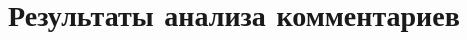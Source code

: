 \begin{comment}
24 & 31. Регулирование и надзор на предприятиях & 0.0171 \\
25 & 49. Районы области & 0.0169 \\
26 & 34. Театры & 0.0168 \\
27 & 38. Коммунальная сфера: отопление & 0.0158 \\
28 & 25. Домашние животные: собаки & 0.0154 \\
29 & 39. Международные отношения России, Украины и США & 0.0148 \\
30 & 40. Информация о различных конкурсах, авиакомпании & 0.012 \\
31 & 24. Жилищный вопрос, социальная сфера & 0.0119 \\
32 & 21. Недвижимость: строительство, продажа & 0.0112 \\
33 & 47. Убийство Ивана Климова & 0.0106 \\
34 & 30. Хоккей: «Авангард» & 0.0105 \\
35 & 23. Ремонт и строительство городской инфраструктуры & 0.0104 \\
36 & 3. IT & 0.0102 \\
37 & 33. Объявления о поиске пропавших & 0.0094 \\
38 & 42. Торжества в честь победы в ВОВ & 0.0088 \\
39 & 13. Дело Юрия Гамбурга & 0.0088 \\
40 & 22. Искусство, литература & 0.0076 \\
41 & 37. Экономические аспекты украинского кризиса & 0.0073 \\
42 & 28. Концерты & 0.0068 \\
43 & 46. Таможенный контроль, правоохранительные органы & 0.0066 \\
44 & 9. Праздники, свадьбы & 0.0065 \\
45 & 8. Банковский сектор & 0.0058 \\
46 & 35. Омские СМИ: телевидение и газеты & 0.0057 \\
47 & 27. Присоединение Крыма & 0.0055 \\
48 & 44. Фильмы, Новый год & 0.0043 \\
49 & 14. Военные учения & 0.0016 \\
50 & 18. Продажа автомобилей & 0.0016 \\
	\hline
\end{longtable}

\end{comment}


\chapter{Результаты анализа комментариев} \label{app:comments}
